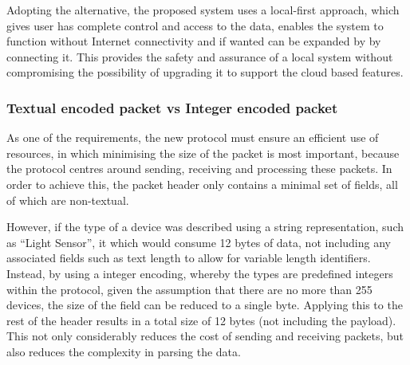 Adopting the alternative,  the proposed system uses a local-first approach, which gives user has complete control and access to the data, enables the system to function without Internet connectivity and if wanted can be expanded by by connecting it. This provides the safety and assurance of a local system without compromising the possibility of upgrading it to support the cloud based features.


\subsubsection{Textual encoded packet vs Integer encoded packet} %
\label{ssub:textual_packet_vs_encoded_packet}
As one of the requirements, the new protocol must ensure an efficient use of resources, in which minimising the size of the packet is most important, because the protocol centres around sending, receiving and processing these packets. In order to achieve this, the packet header only contains a minimal set of fields, all of which are non-textual.

However, if the type of a device was described using a string representation, such as ``Light Sensor'', it which would consume 12 bytes of data, not including any associated fields such as text length to allow for variable length identifiers. Instead, by using a integer encoding, whereby the types are predefined integers within the protocol, given the assumption that there are no more than 255 devices, the size of the field can be reduced to a single byte. Applying this to the rest of the header results in a total size of 12 bytes (not including the payload). This not only considerably reduces the cost of sending and receiving packets, but also reduces the complexity in parsing the data.

